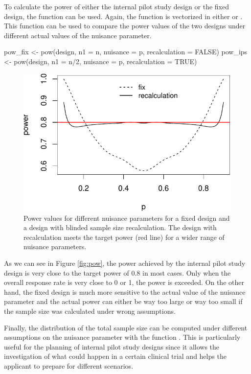 To calculate the power of either the internal pilot study design or the
fixed design, the function  can be used. Again, the function
is vectorized in either  or . This function can
be used to compare the power values of the two designs under different
actual values of the nuisance parameter.

\begin{example}
pow_fix <- pow(design, n1 = n, nuisance = p, recalculation = FALSE)
pow_ips <- pow(design, n1 = n/2, nuisance = p, recalculation = TRUE)
\end{example}

\begin{figure}
\includegraphics{blindrecalc_paper_files/figure-latex/plot-power-1} \caption{\label{fig:pow}Power values for different nuisance parameters for a fixed design and a design with blinded sample size recalculation. The design with recalculation meets the target power (red line) for a wider range of nuisance parameters.}\label{fig:plot-power}
\end{figure}

As we can see in Figure \ref{fig:pow}, the power achieved by the
internal pilot study design is very close to the target power of 0.8 in
most cases. Only when the overall response rate is very close to 0 or 1,
the power is exceeded. On the other hand, the fixed design is much more
sensitive to the actual value of the nuisance parameter and the actual
power can either be way too large or way too small if the sample size
was calculated under wrong assumptions.

Finally, the distribution of the total sample size can be computed under
different assumptions on the nuisance parameter with the function
. This is particularly useful for the planning of internal
pilot study designs since it allows the investigation of what could
happen in a certain clinical trial and helps the applicant to prepare
for different scenarios.

